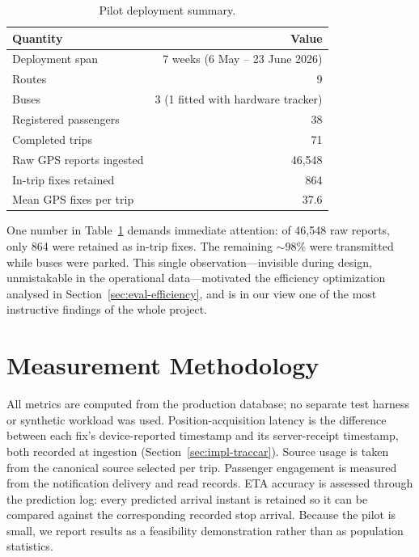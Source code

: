 \begin{table}[H]
\caption{Pilot deployment summary.}
\label{tab:dataset}
\centering
\begin{tabular}{@{}lr@{}}
\toprule
\textbf{Quantity} & \textbf{Value} \\
\midrule
Deployment span            & 7 weeks (6 May -- 23 June 2026) \\
Routes                     & 9 \\
Buses                      & 3 (1 fitted with hardware tracker) \\
Registered passengers      & 38 \\
Completed trips            & 71 \\
Raw GPS reports ingested   & 46{,}548 \\
In-trip fixes retained     & 864 \\
Mean GPS fixes per trip    & 37.6 \\
\bottomrule
\end{tabular}
\end{table}

One number in Table~\ref{tab:dataset} demands immediate attention: of
46{,}548 raw reports, only 864 were retained as in-trip fixes. The
remaining ${\sim}98\%$ were transmitted while buses were parked. This
single observation---invisible during design, unmistakable in the
operational data---motivated the efficiency optimization analysed in
Section~\ref{sec:eval-efficiency}, and is in our view one of the most
instructive findings of the whole project.

\section{Measurement Methodology}
\label{sec:eval-method}
All metrics are computed from the production database; no separate test
harness or synthetic workload was used. Position-acquisition latency is
the difference between each fix's device-reported timestamp and its
server-receipt timestamp, both recorded at ingestion
(Section~\ref{sec:impl-traccar}). Source usage is taken from the
canonical source selected per trip. Passenger engagement is measured
from the notification delivery and read records. ETA accuracy is
assessed through the prediction log: every predicted arrival instant is
retained so it can be compared against the corresponding recorded stop
arrival. Because the pilot is small, we report results as a feasibility
demonstration rather than as population statistics.

